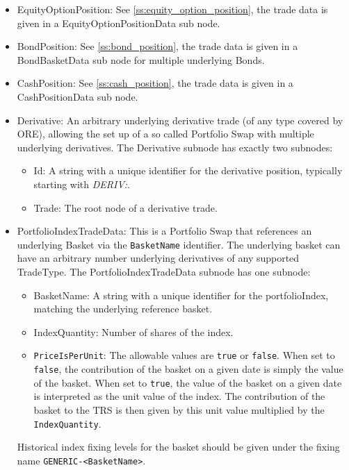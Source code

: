 \begin{itemize}
\begin{itemize}
  \item EquityOptionPosition: See \ref{ss:equity_option_position}, the trade data is given in a EquityOptionPositionData
    sub node.
  \item BondPosition: See \ref{ss:bond_position}, the trade data is given in a BondBasketData sub node for multiple underlying Bonds.
  \item CashPosition: See \ref{ss:cash_position}, the trade data is given in a CashPositionData sub
  node.
  \item Derivative: An arbitrary underlying derivative trade (of any type covered by ORE), allowing the set up of a so called Portfolio Swap with multiple underlying derivatives. The Derivative subnode has exactly two subnodes:
    \begin{itemize}
    \item Id: A string with a unique identifier for the derivative position, typically starting with \emph{DERIV:}. 
    \item Trade: The root node of a derivative trade.
    \end{itemize}
  \item PortfolioIndexTradeData: This is a Portfolio Swap that references an underlying Basket via the \lstinline!BasketName! identifier.
    The underlying basket can have an arbitrary number underlying derivatives of any supported TradeType.
    The PortfolioIndexTradeData subnode has one subnode:
    \begin{itemize}
      \item BasketName: A string with a unique identifier for the portfolioIndex, matching the underlying reference basket.
      \item IndexQuantity: Number of shares of the index.
      \item \lstinline!PriceIsPerUnit!:
        The allowable values are \lstinline!true! or \lstinline!false!.
        When set to \lstinline!false!, the contribution of the basket on a given date is simply the value of the basket.
        When set to \lstinline!true!, the value of the basket on a given date is interpreted as the unit value of the index.
        The contribution of the basket to the TRS is then given by this unit value multiplied by the \lstinline!IndexQuantity!.
    \end{itemize}
    Historical index fixing levels for the basket should be given under the fixing name \lstinline!GENERIC-<BasketName>!.
  \end{itemize}


\end{itemize}
